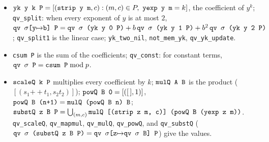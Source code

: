 \begin{definition}
\begin{itemize}
\item $\textnormal{\texttt{yk y k P}} = [(\textnormal{\texttt{strip y m}}, c) : (m,c)\in P,\ \textnormal{\texttt{yexp y m}} = k]$, the coefficient
  of $y^k$; \textnormal{\texttt{qv\_\allowbreak{}split}}: when every exponent of $y$ is at most $2$,
  $\textnormal{\texttt{qv \ensuremath{\sigma}[y\ensuremath{\mapsto}b] P}} = \textnormal{\texttt{qv \ensuremath{\sigma} (\allowbreak{}yk y 0 P)}} + b\,\textnormal{\texttt{qv \ensuremath{\sigma} (\allowbreak{}yk y 1 P)}} + b^2\,\textnormal{\texttt{qv \ensuremath{\sigma} (\allowbreak{}yk y 2 P)}}$;
  \textnormal{\texttt{qv\_\allowbreak{}split1}} is the linear case; \textnormal{\texttt{yk\_\allowbreak{}two\_\allowbreak{}nil}}, \textnormal{\texttt{not\_\allowbreak{}mem\_\allowbreak{}yk}}, \textnormal{\texttt{qv\_\allowbreak{}yk\_\allowbreak{}update}}.
\item \textnormal{\texttt{csum P}} is the sum of the coefficients; \textnormal{\texttt{qv\_\allowbreak{}const}}: for constant terms,
  $\textnormal{\texttt{qv \ensuremath{\sigma} P}} = \textnormal{\texttt{csum P}} \bmod p$.
\item $\textnormal{\texttt{scaleQ k P}}$ multiplies every coefficient by $k$; $\textnormal{\texttt{mulQ A B}}$ is the product
  ($[(s_1\mathbin{+\!\!+}t_1, s_2t_2)]$); $\textnormal{\texttt{powQ B 0}} = [([\,],1)]$,
  $\textnormal{\texttt{powQ B (\allowbreak{}n+1)}} = \textnormal{\texttt{mulQ (\allowbreak{}powQ B n) B}}$;
  $\textnormal{\texttt{substQ z B P}} = \bigcup_{(m,c)}\textnormal{\texttt{mulQ [(\allowbreak{}strip z m,\allowbreak{} c)] (\allowbreak{}powQ B (\allowbreak{}yexp z m))}}$.
  \textnormal{\texttt{qv\_\allowbreak{}scaleQ}}, \textnormal{\texttt{qv\_\allowbreak{}mapmul}}, \textnormal{\texttt{qv\_\allowbreak{}mulQ}}, \textnormal{\texttt{qv\_\allowbreak{}powQ}}, and
  \textnormal{\texttt{qv\_\allowbreak{}substQ}} ($\textnormal{\texttt{qv \ensuremath{\sigma} (\allowbreak{}substQ z B P)}} = \textnormal{\texttt{qv \ensuremath{\sigma}[z\ensuremath{\mapsto}qv \ensuremath{\sigma} B] P}}$) give the values.
\end{itemize}
\end{definition}

